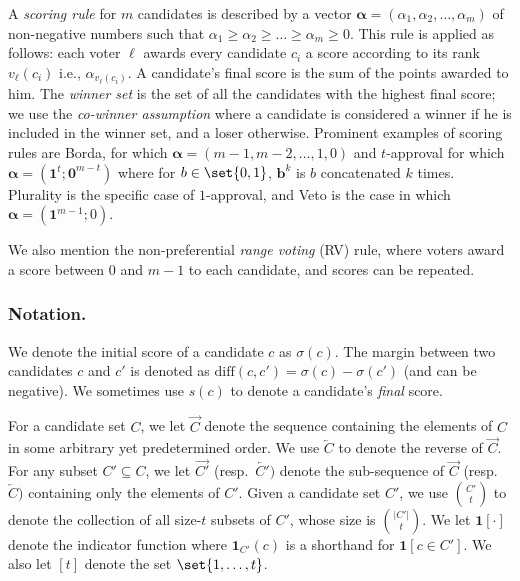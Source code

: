\documentclass[letterpaper]{article} %
\newcommand{\indic}{\mathbf{1}}
\newcommand{\vecc}{\mathbf}
\newcommand{\vecgreek}{\bm}
\newcommand{\veca}{\vecgreek{\alpha}}
\newcommand{\ora}[1]{\overrightarrow{#1}}
\newcommand{\ola}[1]{\overleftarrow{#1}}
\newcommand{\abs}[1]{\lvert{#1}\rvert}
\newcommand{\diff}{\mathrm{diff}}
\begin{document}
A \emph{scoring rule} for $m$ candidates is described by a vector $\veca=\left(\alpha_1,\alpha_2,\ldots,\alpha_m\right)$ of non-negative numbers such that $\alpha_1 \geq \alpha_2 \geq \dots \geq \alpha_m \geq 0$.
This rule is applied as follows: each voter $\ell$ awards every candidate $c_i$ a score according to its rank $v_\ell(c_i)$ i.e., $\alpha_{v_\ell(c_i)}$. A candidate's final score is the sum of the points awarded to him.
The \emph{winner set} is the set of all the candidates with the highest final score; we use the \emph{co-winner assumption} where a candidate is considered a winner if he is included in the winner set, and a loser otherwise. Prominent examples of scoring rules are  Borda, for which  $\veca=(m-1,m-2,\ldots,1,0)$ and $t$-approval for which $\veca=(\vecc{1}^t;\vecc{0}^{m-t})$ where for $b \in \set{0,1}$,  $\vecc{b}^{k}$  is $b$ concatenated $k$ times.
Plurality is the specific case of $1$-approval, and Veto is the case in which $\veca=(\vecc{1}^{m-1};0)$.

We also mention the non-preferential \emph{range voting} (RV)  rule, where voters award a score between $0$ and $m-1$ to each candidate, and scores can be repeated.

\subsubsection{Notation.} We denote the initial score of a candidate $c$ as $\sigma(c)$. The margin between two candidates $c$ and $c'$ is denoted as $\diff(c,c') = \sigma(c) - \sigma(c')$  (and can be negative). We sometimes use $s(c)$ to denote a candidate's \emph{final} score.

For a candidate set $C$, we let $\ora{C}$ denote the sequence containing the elements of $C$ in some arbitrary yet predetermined order. We use  $\ola{C}$ to denote the reverse of $\ora{C}$. For any subset $C' \subseteq C$, we let $\ora{C'}$ (resp.\ $\ola{C'})$ denote the sub-sequence of $\ora{C}$ (resp.\ $\ola{C})$ containing only the elements of $C'$.
Given a candidate set $C'$, we use $\binom{C'}{t}$ to denote the collection of all size-$t$ subsets of $C'$, whose size is $\binom{\abs{C'}}{t}$. We let $\indic[\cdot]$ denote the indicator function where $\indic_{C'}(c)$ is a shorthand for $\indic[c \in C']$.
We also let $[t]$ denote the set $\set{1,\ldots,t}$.
\end{document}

